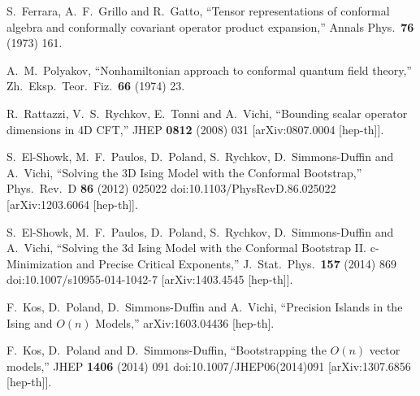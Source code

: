 \documentclass[letterpaper]{article}
\numberwithin{equation}{section}
\begin{document}
\begin{thebibliography}{10}

 
  S.~Ferrara, A.~F.~Grillo and R.~Gatto,
  ``Tensor representations of conformal algebra and conformally covariant operator product expansion,''
  Annals Phys.\  {\bf 76} (1973) 161.
  
  A.~M.~Polyakov,
  ``Nonhamiltonian approach to conformal quantum field theory,''
  Zh.\ Eksp.\ Teor.\ Fiz.\  {\bf 66} (1974) 23.


  R.~Rattazzi, V.~S.~Rychkov, E.~Tonni and A.~Vichi,
  ``Bounding scalar operator dimensions in 4D CFT,''
  JHEP {\bf 0812} (2008) 031
  [arXiv:0807.0004 [hep-th]].

  S.~El-Showk, M.~F.~Paulos, D.~Poland, S.~Rychkov, D.~Simmons-Duffin and A.~Vichi,
  ``Solving the 3D Ising Model with the Conformal Bootstrap,''
  Phys.\ Rev.\ D {\bf 86} (2012) 025022
  doi:10.1103/PhysRevD.86.025022
  [arXiv:1203.6064 [hep-th]].

  S.~El-Showk, M.~F.~Paulos, D.~Poland, S.~Rychkov, D.~Simmons-Duffin and A.~Vichi,
  ``Solving the 3d Ising Model with the Conformal Bootstrap II. c-Minimization and Precise Critical Exponents,''
  J.\ Stat.\ Phys.\  {\bf 157} (2014) 869
  doi:10.1007/s10955-014-1042-7
  [arXiv:1403.4545 [hep-th]].
  
  F.~Kos, D.~Poland, D.~Simmons-Duffin and A.~Vichi,
  ``Precision Islands in the Ising and $O(n)$ Models,''
  arXiv:1603.04436 [hep-th].
  
  F.~Kos, D.~Poland and D.~Simmons-Duffin,
  ``Bootstrapping the $O(n)$ vector models,''
  JHEP {\bf 1406} (2014) 091
  doi:10.1007/JHEP06(2014)091
  [arXiv:1307.6856 [hep-th]].


\end{thebibliography}
\end{document}
